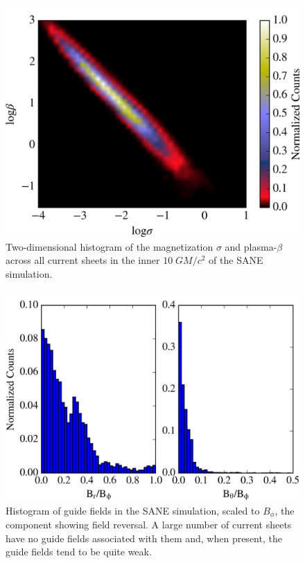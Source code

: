 \begin{figure}[!h]
	\centering
	\includegraphics[width =\textwidth]{paper2_fig5.jpg}
	\caption{Two-dimensional histogram of the magnetization $\sigma$ and plasma-$\beta$ across all current sheets in the inner $10 \; GM/c^2$ of the SANE simulation.}
	\label{SANE_hist}
\end{figure}

\begin{figure}[!h]
	\centering
	\includegraphics[width =\textwidth]{paper2_fig6.jpg}
	\caption{Histogram of guide fields in the SANE simulation, scaled to $B_{\phi}$, the component showing field reversal.  A large number of current sheets have no guide fields associated with them and, when present, the guide fields tend to be quite weak.}
	\label{SANE_bguide}
\end{figure}



